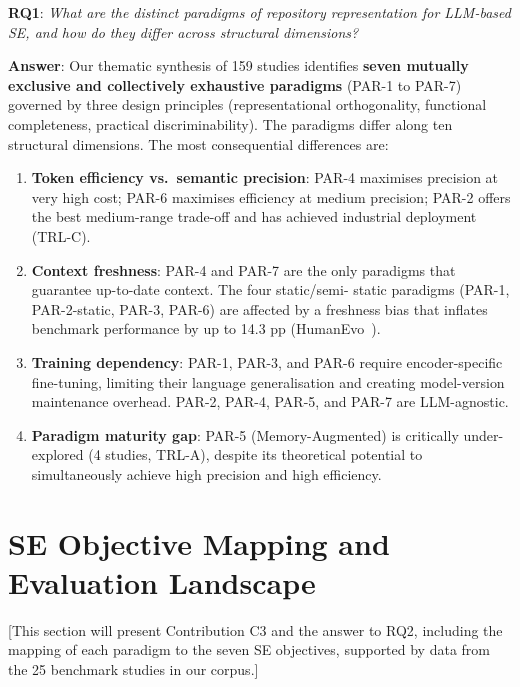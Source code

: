 \documentclass[acmsmall,screen,review]{acmart}
\begin{document}
\begin{tcolorbox}[colback=gray!10, colframe=black!60, title=\textbf{Answer to RQ1}]
\textbf{RQ1}: \textit{What are the distinct paradigms of repository
representation for LLM-based SE, and how do they differ across
structural dimensions?}

\medskip
\noindent \textbf{Answer}: Our thematic synthesis of 159 studies
identifies \textbf{seven mutually exclusive and collectively exhaustive
paradigms} (PAR-1 to PAR-7) governed by three design principles
(representational orthogonality, functional completeness, practical
discriminability). The paradigms differ along ten structural dimensions.
The most consequential differences are:
\begin{enumerate}
  \item \textbf{Token efficiency vs.\ semantic precision}: PAR-4
    maximises precision at very high cost; PAR-6 maximises efficiency at
    medium precision; PAR-2 offers the best medium-range trade-off and
    has achieved industrial deployment (TRL-C).
  \item \textbf{Context freshness}: PAR-4 and PAR-7 are the only
    paradigms that guarantee up-to-date context. The four static/semi-
    static paradigms (PAR-1, PAR-2-static, PAR-3, PAR-6) are affected
    by a freshness bias that inflates benchmark performance by up to
    14.3 pp (HumanEvo~\cite{Zheng2025HumanEvo}).
  \item \textbf{Training dependency}: PAR-1, PAR-3, and PAR-6 require
    encoder-specific fine-tuning, limiting their language generalisation
    and creating model-version maintenance overhead. PAR-2, PAR-4, PAR-5,
    and PAR-7 are LLM-agnostic.
  \item \textbf{Paradigm maturity gap}: PAR-5 (Memory-Augmented) is
    critically under-explored (4 studies, TRL-A), despite its
    theoretical potential to simultaneously achieve high precision and
    high efficiency.
\end{enumerate}
\end{tcolorbox}

\section{SE Objective Mapping and Evaluation Landscape}
\label{sec:discussion}

[This section will present Contribution C3 and the answer to RQ2,
including the mapping of each paradigm to the seven SE objectives,
supported by data from the 25 benchmark studies in our corpus.]
\end{document}
